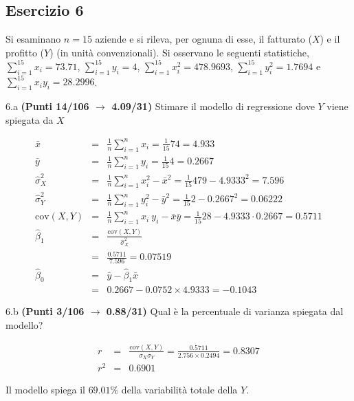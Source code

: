 \documentclass[
  11pt,
]{book}
\theoremstyle{mytheoremstyle}
\theoremstyle{mydefstyle}
\newenvironment{sol}
  {
  \begin{tcolorbox}[enhanced,breakable,arc=0.1mm,boxrule=1pt,colback=white,colframe=iblue,
  title=\bf \fontfamily{lmss}\selectfont \hspace{.5 cm} Soluzione,drop fuzzy shadow]

}{
\end{tcolorbox}
  }
\begin{document}
\subsection{Esercizio 6}\label{esercizio-6-7}

Si esaminano \(n=15\) aziende e si rileva, per ognuna di esse, il
fatturato (\(X\)) e il profitto (\(Y\)) (in unità convenzionali).
Si osservano le seguenti statistiche, \(\sum_{i=1}^{15}x_i=73.71\), \(\sum_{i=1}^{15}y_i=4\),
\(\sum_{i=1}^{15}x_i^2=478.9693\), \(\sum_{i=1}^{15}y_i^2=1.7694\) e \(\sum_{i=1}^{15}x_iy_i=28.2996\).

6.a \textbf{(Punti 14/106 \(\rightarrow\) 4.09/31)} Stimare il modello di regressione dove \(Y\) viene spiegata da \(X\)

\begin{sol}
\begin{eqnarray*}
           \bar x &=&\frac 1 n\sum_{i=1}^n x_i = \frac {1}{ 15 }  74 =  4.933 \\
           \bar y &=&\frac 1 n\sum_{i=1}^n y_i = \frac {1}{ 15 }  4 =  0.2667 \\
           \hat\sigma_X^2&=&\frac 1 n\sum_{i=1}^n x_i^2-\bar x^2=\frac {1}{ 15 }  479  - 4.9333 ^2= 7.596 \\
           \hat\sigma_Y^2&=&\frac 1 n\sum_{i=1}^n y_i^2-\bar y^2=\frac {1}{ 15 }  2  - 0.2667 ^2= 0.06222 \\
           \text{cov}(X,Y)&=&\frac 1 n\sum_{i=1}^n x_i~y_i-\bar x\bar y=\frac {1}{ 15 }  28 - 4.9333 \cdot 0.2667 = 0.5711 \\
           \hat\beta_1 &=& \frac{\text{cov}(X,Y)}{\hat\sigma_X^2} \\
                    &=& \frac{ 0.5711 }{ 7.596 }  =  0.07519 \\
           \hat\beta_0 &=& \bar y - \hat\beta_1 \bar x\\
                    &=&  0.2667 - 0.0752 \times  4.9333 = -0.1043 
         \end{eqnarray*}

\end{sol}

6.b \textbf{(Punti 3/106 \(\rightarrow\) 0.88/31)} Qual è la percentuale di varianza spiegata dal modello?

\begin{sol}
\begin{eqnarray*}
r&=&\frac{\text{cov}(X,Y)}{\sigma_X\sigma_Y}=\frac{ 0.5711 }{ 2.756 \times 0.2494 }= 0.8307 \\ 
r^2&=& 0.6901\end{eqnarray*}

Il modello spiega il \(69.01\%\) della variabilità totale della \(Y\).

\end{sol}
\end{document}
